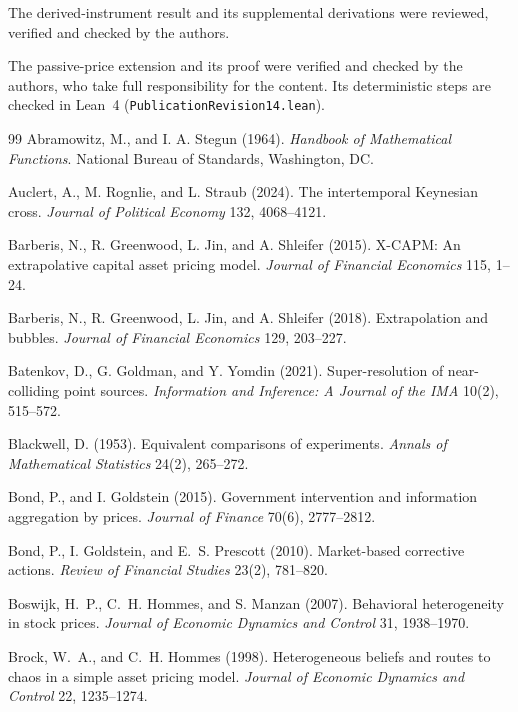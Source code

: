 \documentclass[12pt]{article}
\theoremstyle{definition}
\theoremstyle{remark}
\begin{document}
The derived-instrument result and its supplemental derivations were reviewed, verified and checked by the authors.

The passive-price extension and its proof were verified and checked by the authors, who take full responsibility for the content. Its deterministic steps are checked in Lean~4 (\nolinkurl{PublicationRevision14.lean}).

\begin{thebibliography}{99}\setlength{\itemsep}{2pt}\small
{} Abramowitz, M., and I. A. Stegun (1964). \emph{Handbook of Mathematical Functions}. National Bureau of Standards, Washington, DC.

 Auclert, A., M. Rognlie, and L. Straub (2024). The intertemporal Keynesian cross. \emph{Journal of Political Economy} 132, 4068--4121.

 Barberis, N., R. Greenwood, L. Jin, and A. Shleifer (2015). X-CAPM: An extrapolative capital asset pricing model. \emph{Journal of Financial Economics} 115, 1--24.

 Barberis, N., R. Greenwood, L. Jin, and A. Shleifer (2018). Extrapolation and bubbles. \emph{Journal of Financial Economics} 129, 203--227.

 Batenkov, D., G. Goldman, and Y. Yomdin (2021). Super-resolution of near-colliding point sources. \emph{Information and Inference: A Journal of the IMA} 10(2), 515--572.

 Blackwell, D. (1953). Equivalent comparisons of experiments. \emph{Annals of Mathematical Statistics} 24(2), 265--272.

 Bond, P., and I. Goldstein (2015). Government intervention and information aggregation by prices. \emph{Journal of Finance} 70(6), 2777--2812.

 Bond, P., I. Goldstein, and E.~S. Prescott (2010). Market-based corrective actions. \emph{Review of Financial Studies} 23(2), 781--820.

 Boswijk, H.~P., C.~H. Hommes, and S. Manzan (2007). Behavioral heterogeneity in stock prices. \emph{Journal of Economic Dynamics and Control} 31, 1938--1970.

 Brock, W.~A., and C.~H. Hommes (1998). Heterogeneous beliefs and routes to chaos in a simple asset pricing model. \emph{Journal of Economic Dynamics and Control} 22, 1235--1274.


\end{thebibliography}
\end{document}
